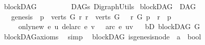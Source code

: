 %
\begin{isabellebody}%
%
%
\isadelimtheory
\isanewline
\isanewline
%
\endisadelimtheory
%
\isatagtheory
{}\isamarkupfalse%
\ blockDAG\ \ \ \ \ \ \isanewline
\ \ \ DAGs\ DigraphUtils\isanewline
{}%
\endisatagtheory
{\isafoldtheory}%
%
\isadelimtheory
%
\endisadelimtheory
%
\isadelimdocument
%
\endisadelimdocument
%
\isatagdocument
%
\isamarkuptrue%
%
\endisatagdocument
{\isafolddocument}%
%
\isadelimdocument
%
\endisadelimdocument
{}\isamarkupfalse%
\ blockDAG\ {\isacharequal}{\kern0pt}\ DAG\ \ {\isacharplus}{\kern0pt}\isanewline
\ \ \ genesis{\isacharcolon}{\kern0pt}\ \ {\isachardoublequoteopen}{\isasymexists}p\ {\isasymin}\ verts\ G{\isachardot}{\kern0pt}\ {\isasymforall}r{\isachardot}{\kern0pt}\ r\ {\isasymin}\ verts\ G\ \ {\isasymlongrightarrow}\ {\isacharparenleft}{\kern0pt}r\ {\isasymrightarrow}\isactrlsup {\isacharplus}{\kern0pt}\isactrlbsub G\isactrlesub \ p\ {\isasymor}\ r\ {\isacharequal}{\kern0pt}\ p{\isacharparenright}{\kern0pt}{\isachardoublequoteclose}\ \ \ \ \ \ \ \isanewline
\ \ \ \ \ only{\isacharunderscore}{\kern0pt}new{\isacharcolon}{\kern0pt}\ {\isachardoublequoteopen}{\isasymforall}e{\isachardot}{\kern0pt}\ {\isacharparenleft}{\kern0pt}u\ {\isasymrightarrow}\isactrlsup {\isacharplus}{\kern0pt}\isactrlbsub {\isacharparenleft}{\kern0pt}del{\isacharunderscore}{\kern0pt}arc\ e{\isacharparenright}{\kern0pt}\isactrlesub \ v{\isacharparenright}{\kern0pt}\ {\isasymlongrightarrow}\ {\isasymnot}\ arc\ e\ {\isacharparenleft}{\kern0pt}u{\isacharcomma}{\kern0pt}v{\isacharparenright}{\kern0pt}{\isachardoublequoteclose}\isanewline
{}\ \isanewline
\isanewline
{}\isamarkupfalse%
\ bD{\isacharcolon}{\kern0pt}\ {\isachardoublequoteopen}blockDAG\ G{\isachardoublequoteclose}%
\isadelimproof
\ %
\endisadelimproof
%
\isatagproof
{}\isamarkupfalse%
\ blockDAG{\isacharunderscore}{\kern0pt}axioms\ \isamarkupfalse%
\ simp%
\endisatagproof
{\isafoldproof}%
%
\isadelimproof
%
\endisadelimproof
\isanewline
\isanewline
{}\isamarkupfalse%
%
\isadelimdocument
%
\endisadelimdocument
%
\isatagdocument
%
\isamarkuptrue%
%
\endisatagdocument
{\isafolddocument}%
%
\isadelimdocument
%
\endisadelimdocument
{}\isamarkupfalse%
\ {\isacharparenleft}{\kern0pt}\ blockDAG{\isacharparenright}{\kern0pt}\ is{\isacharunderscore}{\kern0pt}genesis{\isacharunderscore}{\kern0pt}node\ {\isacharcolon}{\kern0pt}{\isacharcolon}{\kern0pt}\ {\isachardoublequoteopen}{\isacharprime}{\kern0pt}a\ {\isasymRightarrow}\ bool{\isachardoublequoteclose}\ \isanewline

\end{isabellebody}
